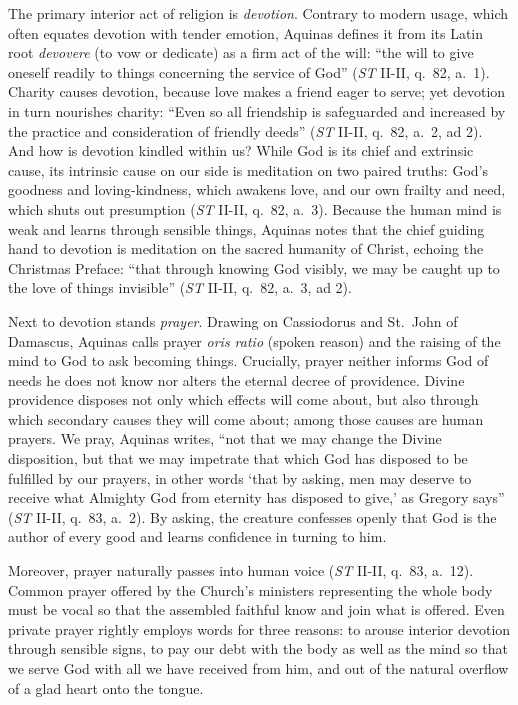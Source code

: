 The primary interior act of religion is \emph{devotion}. Contrary to modern usage, which often equates devotion with tender emotion, Aquinas defines it from its Latin root \emph{devovere} (to vow or dedicate) as a firm act of the will: ``the will to give oneself readily to things concerning the service of God'' (\emph{ST} II-II, q.\ 82, a.\ 1). Charity causes devotion, because love makes a friend eager to serve; yet devotion in turn nourishes charity: ``Even so all friendship is safeguarded and increased by the practice and consideration of friendly deeds'' (\emph{ST} II-II, q.\ 82, a.\ 2, ad 2). And how is devotion kindled within us? While God is its chief and extrinsic cause, its intrinsic cause on our side is meditation on two paired truths: God's goodness and loving-kindness, which awakens love, and our own frailty and need, which shuts out presumption (\emph{ST} II-II, q.\ 82, a.\ 3). Because the human mind is weak and learns through sensible things, Aquinas notes that the chief guiding hand to devotion is meditation on the sacred humanity of Christ, echoing the Christmas Preface: ``that through knowing God visibly, we may be caught up to the love of things invisible'' (\emph{ST} II-II, q.\ 82, a.\ 3, ad 2).

Next to devotion stands \emph{prayer}. Drawing on Cassiodorus and St.\ John of Damascus, Aquinas calls prayer \emph{oris ratio} (spoken reason) and the raising of the mind to God to ask becoming things. Crucially, prayer neither informs God of needs he does not know nor alters the eternal decree of providence. Divine providence disposes not only which effects will come about, but also through which secondary causes they will come about; among those causes are human prayers. We pray, Aquinas writes, ``not that we may change the Divine disposition, but that we may impetrate that which God has disposed to be fulfilled by our prayers, in other words `that by asking, men may deserve to receive what Almighty God from eternity has disposed to give,' as Gregory says'' (\emph{ST} II-II, q.\ 83, a.\ 2). By asking, the creature confesses openly that God is the author of every good and learns confidence in turning to him.

Moreover, prayer naturally passes into human voice (\emph{ST} II-II, q.\ 83, a.\ 12). Common prayer offered by the Church's ministers representing the whole body must be vocal so that the assembled faithful know and join what is offered. Even private prayer rightly employs words for three reasons: to arouse interior devotion through sensible signs, to pay our debt with the body as well as the mind so that we serve God with all we have received from him, and out of the natural overflow of a glad heart onto the tongue.

